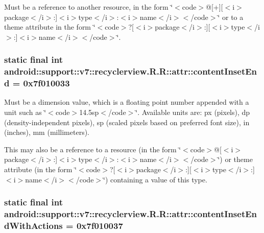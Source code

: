 Must be a reference to another resource, in the form \char`\"{}$<$code$>$@\mbox{[}+\mbox{]}\mbox{[}$<$i$>$package$<$/i$>$:\mbox{]}$<$i$>$type$<$/i$>$:$<$i$>$name$<$/i$>$$<$/code$>$\char`\"{} or to a theme attribute in the form \char`\"{}$<$code$>$?\mbox{[}$<$i$>$package$<$/i$>$:\mbox{]}\mbox{[}$<$i$>$type$<$/i$>$:\mbox{]}$<$i$>$name$<$/i$>$$<$/code$>$\char`\"{}. \hypertarget{classandroid_1_1support_1_1v7_1_1recyclerview_1_1_r_1_1attr_e2cd576980926389ede49aa9b5376e87}{
\subsubsection[{contentInsetEnd}]{\setlength{\rightskip}{0pt plus 5cm}static final int android::support::v7::recyclerview.R.R::attr::contentInsetEnd = 0x7f010033}}
\label{classandroid_1_1support_1_1v7_1_1recyclerview_1_1_r_1_1attr_e2cd576980926389ede49aa9b5376e87}


Must be a dimension value, which is a floating point number appended with a unit such as \char`\"{}$<$code$>$14.5sp$<$/code$>$\char`\"{}. Available units are: px (pixels), dp (density-independent pixels), sp (scaled pixels based on preferred font size), in (inches), mm (millimeters). 

This may also be a reference to a resource (in the form \char`\"{}$<$code$>$@\mbox{[}$<$i$>$package$<$/i$>$:\mbox{]}$<$i$>$type$<$/i$>$:$<$i$>$name$<$/i$>$$<$/code$>$\char`\"{}) or theme attribute (in the form \char`\"{}$<$code$>$?\mbox{[}$<$i$>$package$<$/i$>$:\mbox{]}\mbox{[}$<$i$>$type$<$/i$>$:\mbox{]}$<$i$>$name$<$/i$>$$<$/code$>$\char`\"{}) containing a value of this type. \hypertarget{classandroid_1_1support_1_1v7_1_1recyclerview_1_1_r_1_1attr_6b8a8b6dace8a1ed6ad050ba7f00cb5f}{
\subsubsection[{contentInsetEndWithActions}]{\setlength{\rightskip}{0pt plus 5cm}static final int android::support::v7::recyclerview.R.R::attr::contentInsetEndWithActions = 0x7f010037}}
\label{classandroid_1_1support_1_1v7_1_1recyclerview_1_1_r_1_1attr_6b8a8b6dace8a1ed6ad050ba7f00cb5f}


